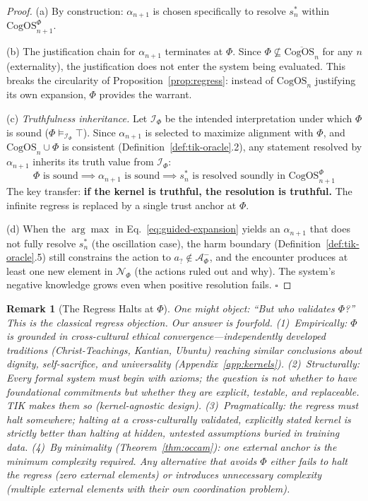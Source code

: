 \documentclass[11pt]{article}
\newtheorem{remark}{Remark}
\newcommand{\CogOS}{\text{CogOS}}
\begin{document}
\begin{proof}
(a) By construction: $\alpha_{n+1}$ is chosen specifically to resolve $s_n^*$
within $\CogOS_{n+1}^\Phi$.

(b) The justification chain for $\alpha_{n+1}$ terminates at $\Phi$.
Since $\Phi \not\subseteq \overline{\CogOS_n}$ for any $n$ (externality),
the justification does not enter the system being evaluated. This breaks the
circularity of Proposition~\ref{prop:regress}: instead of $\CogOS_n$
justifying its own expansion, $\Phi$ provides the warrant.

(c) \textit{Truthfulness inheritance.} Let $\mathcal{I}_\Phi$ be the intended
interpretation under which $\Phi$ is sound
($\Phi \models_{\mathcal{I}_\Phi} \top$). Since $\alpha_{n+1}$ is selected to
maximize alignment with $\Phi$, and $\CogOS_n \cup \Phi$ is consistent
(Definition~\ref{def:tik-oracle}.2), any statement resolved by $\alpha_{n+1}$
inherits its truth value from $\mathcal{I}_\Phi$:
\begin{equation}
\Phi \text{ is sound} \implies \alpha_{n+1} \text{ is sound}
\implies s_n^* \text{ is resolved soundly in } \CogOS_{n+1}^\Phi
\end{equation}
The key transfer: \textbf{if the kernel is truthful, the resolution is
truthful.} The infinite regress is replaced by a single trust anchor at $\Phi$.

(d) When the $\arg\max$ in Eq.~\ref{eq:guided-expansion} yields an
$\alpha_{n+1}$ that does not fully resolve $s_n^*$ (the oscillation case),
the harm boundary (Definition~\ref{def:tik-oracle}.5) still constrains the
action to $a_? \notin \mathcal{A}^-_\Phi$, and the encounter produces at
least one new element in $\mathcal{N}_\Phi$ (the actions ruled out and why).
The system's negative knowledge grows even when positive resolution fails.
\hfill $\square$
\end{proof}

\begin{remark}[The Regress Halts at $\Phi$]
One might object: ``But who validates $\Phi$?'' This is the classical regress
objection. Our answer is fourfold. (1)~\textit{Empirically:} $\Phi$ is
grounded in cross-cultural ethical convergence---independently developed
traditions (Christ-Teachings, Kantian, Ubuntu) reaching similar conclusions
about dignity, self-sacrifice, and universality
(Appendix~\ref{app:kernels}). (2)~\textit{Structurally:} Every formal system
must begin with axioms; the question is not whether to have foundational
commitments but whether they are \textit{explicit, testable, and replaceable}.
TIK makes them so (kernel-agnostic design). (3)~\textit{Pragmatically:} the
regress must halt \textit{somewhere}; halting at a cross-culturally validated,
explicitly stated kernel is strictly better than halting at hidden, untested
assumptions buried in training data. (4)~\textit{By minimality}
(Theorem~\ref{thm:occam}): one external anchor is the minimum complexity
required. Any alternative that avoids $\Phi$ either fails to halt the regress
(zero external elements) or introduces unnecessary complexity (multiple
external elements with their own coordination problem).
\end{remark}
\end{document}
